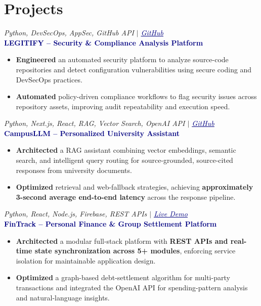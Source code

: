 \documentclass[a4paper,10pt]{article}
\newcommand{\navylink}[2]{\href{#1}{\textcolor{navy}{\uline{#2}}}}
\newcommand{\projectheader}[4]{%
  \vspace{2pt}
  {\hfill \fontsize{8.5}{10}\selectfont\itshape\textcolor{dategray}{#2} $|$ \navylink{#4}{#3}}\\[-9pt]
  {\textcolor{navy}{\textbf{#1}}}\vspace{1pt}
}
\begin{document}
\section{Projects}

\projectheader{LEGITIFY -- Security \& Compliance Analysis Platform}{Python, DevSecOps, AppSec, GitHub API}{GitHub}{https://github.com/Shri-Sanjaykumar/LEGITIFY}
\begin{itemize}[leftmargin=0.19in, itemsep=1pt, topsep=2pt, parsep=0pt]
    \item \textbf{Engineered} an automated security platform to analyze source-code repositories and detect configuration vulnerabilities using secure coding and DevSecOps practices.
    \item \textbf{Automated} policy-driven compliance workflows to flag security issues across repository assets, improving audit repeatability and execution speed.
\end{itemize}

\projectheader{CampusLLM -- Personalized University Assistant}{Python, Next.js, React, RAG, Vector Search, OpenAI API}{GitHub}{https://github.com/Shri-Sanjaykumar/campusLLM}
\begin{itemize}[leftmargin=0.19in, itemsep=1pt, topsep=2pt, parsep=0pt]
    \item \textbf{Architected} a RAG assistant combining vector embeddings, semantic search, and intelligent query routing for source-grounded, source-cited responses from university documents.
    \item \textbf{Optimized} retrieval and web-fallback strategies, achieving \textbf{approximately 3-second average end-to-end latency} across the response pipeline.
\end{itemize}

\projectheader{FinTrack -- Personal Finance \& Group Settlement Platform}{Python, React, Node.js, Firebase, REST APIs}{Live Demo}{https://fin-track-mauve-sigma.vercel.app/}
\begin{itemize}[leftmargin=0.19in, itemsep=1pt, topsep=2pt, parsep=0pt]
    \item \textbf{Architected} a modular full-stack platform with \textbf{REST APIs and real-time state synchronization across 5+ modules}, enforcing service isolation for maintainable application design.
    \item \textbf{Optimized} a graph-based debt-settlement algorithm for multi-party transactions and integrated the OpenAI API for spending-pattern analysis and natural-language insights.
\end{itemize}
\end{document}
